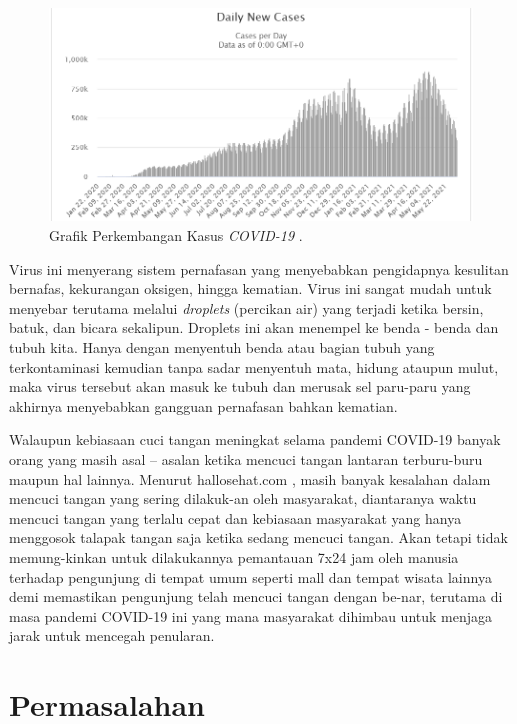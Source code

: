 \newpage
\begin{figure}[ht]
	\centering
	
	\includegraphics[width=0.9\columnwidth]{gambar/worldometer.PNG}
	
	\caption{Grafik Perkembangan Kasus \emph{COVID-19} \citep{cit:covidcase}.}
	\label{fig:covidstat}
\end{figure}

Virus ini menyerang sistem pernafasan yang menyebabkan pengidapnya kesulitan bernafas, kekurangan oksigen, hingga kematian. Virus ini sangat mudah untuk menyebar terutama melalui \emph{droplets} (percikan air) yang terjadi ketika bersin, batuk, dan bicara sekalipun. Droplets ini akan menempel ke benda - benda dan tubuh kita. Hanya dengan menyentuh benda atau bagian tubuh yang terkontaminasi kemudian tanpa sadar menyentuh mata, hidung ataupun mulut, maka virus tersebut akan masuk ke tubuh dan merusak sel paru-paru yang akhirnya menyebabkan gangguan pernafasan bahkan kematian.

Walaupun kebiasaan cuci tangan meningkat selama pandemi COVID-19 \cite{cit:cucisabun} banyak orang yang masih asal – asalan ketika mencuci tangan lantaran terburu-buru maupun hal lainnya. Menurut hallosehat.com \cite{cit:salahcuci} , masih banyak kesalahan dalam mencuci tangan yang sering dilakuk-an oleh masyarakat, diantaranya waktu mencuci tangan yang terlalu cepat dan kebiasaan masyarakat yang hanya menggosok talapak tangan saja ketika sedang mencuci tangan. Akan tetapi tidak memung-kinkan untuk dilakukannya pemantauan 7x24 jam oleh manusia terhadap pengunjung di tempat umum seperti mall dan tempat wisata lainnya demi memastikan pengunjung telah mencuci tangan dengan be-nar, terutama di masa pandemi COVID-19 ini yang mana masyarakat dihimbau untuk menjaga jarak untuk mencegah penularan.

\section{Permasalahan}
\label{sec:permasalahan}

